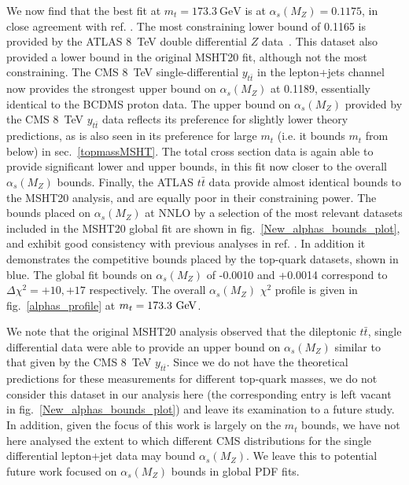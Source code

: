 \documentclass[sn-mathphys]{sn-jnl}%
\newcommand{\ytt}{y_{t\bar{t}}}
\newcommand{\mt}{m_t}
\newcommand{\ttbar}{t\bar{t}}
\newcommand{\as}{\alpha_s(M_Z)}
\begin{document}
We now find that the best fit at $\mt=173.3~\mathrm{GeV}$ is at $\as=0.1175$, in close agreement with ref. \cite{Cridge:2021qfd}. The most constraining lower bound of 0.1165 is provided by the ATLAS 8~TeV double differential $Z$ data~\cite{ATLAS:2017rue}. This dataset also provided a lower bound in the original MSHT20 fit, although not the most constraining. The CMS 8~TeV single-differential $\ytt$ in the lepton+jets channel now provides the strongest upper bound on $\as$ at 0.1189, essentially identical to the BCDMS proton data. The upper bound on $\as$ provided by the CMS 8~TeV $\ytt$ data reflects its preference for slightly lower theory predictions, as is also seen in its preference for large $\mt$ (i.e. it bounds $\mt$ from below) in sec.~\ref{topmassMSHT}. The total cross section data is again able to provide significant lower and upper bounds, in this fit now closer to the overall $\as$ bounds. Finally, the ATLAS $\ttbar$ data provide almost identical bounds to the MSHT20 analysis, and are equally poor in their constraining power. The bounds placed on $\as$ at NNLO by a selection of the most relevant datasets included in the MSHT20 global fit are shown in fig.~\ref{New_alphas_bounds_plot}, and exhibit good consistency with previous analyses in ref. \cite{Cridge:2021qfd}. In addition it demonstrates the competitive bounds placed by the top-quark datasets, shown in blue. The global fit bounds on $\as$ of -0.0010 and +0.0014 correspond to $\Delta\chi^2 = +10, +17$ respectively. The overall $\as$ $\chi^2$ profile is given in fig.~\ref{alphas_profile} at $\mt=173.3~{\rm GeV}$.

We note that the original MSHT20 analysis observed that the dileptonic $\ttbar$, single differential data were able to provide an upper bound on $\as$ similar to that given by the CMS 8~TeV $\ytt$. Since we do not have the theoretical predictions for these measurements for different top-quark masses, we do not consider this dataset in our analysis here (the corresponding entry is left vacant in fig.~\ref{New_alphas_bounds_plot}) and leave its examination to a future study. In addition, given the focus of this work is largely on the $\mt$ bounds, we have not here analysed the extent to which different CMS distributions for the single differential lepton+jet data may bound $\as$. We leave this to potential future work focused on $\as$ bounds in global PDF fits. 
\end{document}
